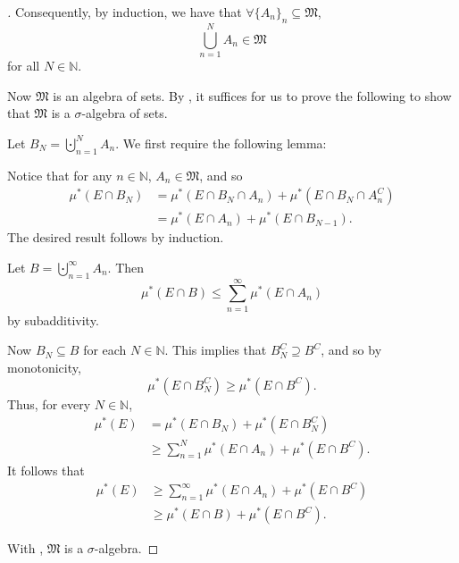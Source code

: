 \documentclass[notoc,notitlepage]{tufte-book}
\begin{document}
\begin{proof}[]
  Consequently, by induction,
  we have that $\forall \{ A_n \}_n \subseteq \mathfrak{M}$,
  \begin{equation*}
    \bigcup_{n=1}^{N} A_n \in \mathfrak{M}
  \end{equation*}
  for all $N \in \mathbb{N}$.

  Now $\mathfrak{M}$ is an algebra of sets.
  By , it suffices for us to prove the following
  to show that $\mathfrak{M}$ is a $\sigma$-algebra of sets.

  \noindent
  Let $B_N = \bigcupdot_{n=1}^{N} A_n$.
  We first require the following lemma:

  \noindent
  Notice that for any $n \in \mathbb{N}$, $A_n \in \mathfrak{M}$, and so
  \begin{align*}
    \mu^*(E \cap B_N)
    &= \mu^*(E \cap B_N \cap A_n) + \mu^*(E \cap B_N \cap A_n^C) \\
    &= \mu^*(E \cap A_n) + \mu^*(E \cap B_{N-1}).
  \end{align*}
  The desired result follows by induction. \dashv

  Let $B = \bigcupdot_{n=1}^{\infty} A_n$.
  Then
  \begin{equation*}
    \mu^*(E \cap B) \leq \sum_{n=1}^{\infty} \mu^* ( E \cap A_n )
  \end{equation*}
  by subadditivity.

  Now $B_N \subseteq B$ for each $N \in \mathbb{N}$.
  This implies that $B_N^C \supseteq B^C$, and so by monotonicity,
  \begin{equation*}
    \mu^*(E \cap B_N^C) \geq \mu^*(E \cap B^C).
  \end{equation*}
  Thus, for every $N \in \mathbb{N}$,
  \begin{align*}
    \mu^*(E)
    &= \mu^*(E \cap B_N) + \mu^*(E \cap B_N^C) \\
    &\geq \sum_{n=1}^{N} \mu^*(E \cap A_n) + \mu^*(E \cap B^C).
  \end{align*}
  It follows that
  \begin{align*}
    \mu^*(E)
    &\geq \sum_{n=1}^{\infty} \mu^*(E \cap A_n) + \mu^*(E \cap B^C) \\
    &\geq \mu^*(E \cap B) + \mu^*(E \cap B^C).
  \end{align*}

  With , $\mathfrak{M}$ is a $\sigma$-algebra.


\end{proof}
\end{document}
